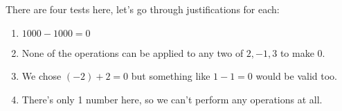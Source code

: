 There are four tests here, let's go through justifications for each:

\begin{enumerate}
    \item $1000 - 1000 = 0$
    \item None of the operations can be applied to any two of $2,-1, 3$ to make $0$.
    \item We chose $(-2) + 2 = 0$ but something like $1 - 1 = 0$ would be valid too.
    \item There's only 1 number here, so we can't perform any operations at all.
\end{enumerate}